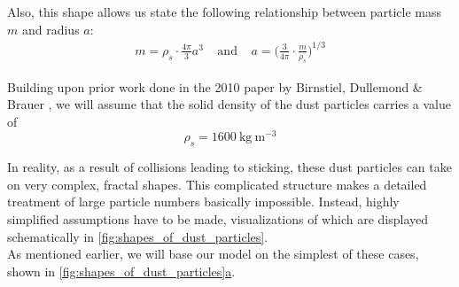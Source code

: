         Also, this shape allows us state the following relationship between 
        particle mass $m$ and radius $a$:
        \begin{align}
            m
                =\rho_s \cdot \frac{4\pi}{3}a^3
            \ \ \ \ \ \text{and}\ \ \ \ \
            a
                =\bigg(\frac{3}{4\pi} \cdot \frac{m}{\rho_s}\bigg)^{1/3}
        \end{align}

        Building upon prior work done in the 2010 paper by Birnstiel, Dullemond \& Brauer 
        \cite{birnstiel_dullemond_brauer_2010}, we will assume that the solid density of the dust 
        particles carries a value of
        \begin{equation}
            \rho_s = \SI{1600}{\kilogram~\meter^{-3}}
        \end{equation}

        In reality, as a result of collisions leading to sticking, these dust particles can 
        take on very complex, fractal shapes.
        This complicated structure makes a detailed treatment of large particle numbers 
        basically impossible. Instead, highly simplified assumptions have to be made,
        visualizations of which are displayed schematically in 
        \cref{fig:shapes_of_dust_particles}. \\

        As mentioned earlier, we will base our model on 
        the simplest of these cases, shown in \hyperref[fig:shapes_of_dust_particles]
        {\cref*{fig:shapes_of_dust_particles}a}. 


        \vfill


